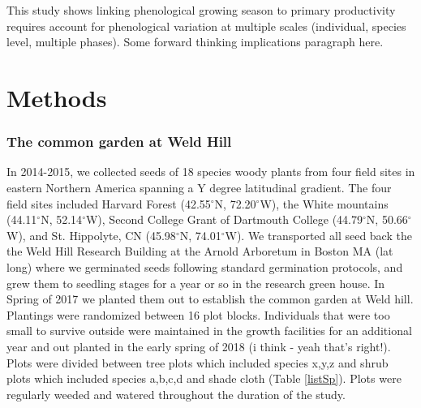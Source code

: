 \documentclass{article}[12pt]
\begin{document}
 This study shows linking phenological growing season to primary productivity requires account for phenological variation at multiple scales (individual, species level, multiple phases). Some forward thinking implications paragraph here.
 
 
\section{Methods} %
\subsubsection{The common garden at Weld Hill}
In 2014-2015, we collected seeds of 18 species woody plants from four field sites in eastern Northern America spanning a Y degree latitudinal gradient. The four field sites included Harvard Forest (42.55$^{\circ}$N, 72.20$^{\circ}$W), the White mountains (44.11$^{\circ}$N, 52.14$^{\circ}$W), Second College Grant of Dartmouth College (44.79$^{\circ}$N, 50.66$^{\circ}$W), and St. Hippolyte, CN (45.98$^{\circ}$N, 74.01$^{\circ}$W). We transported all seed back the the Weld Hill Research Building at the Arnold Arboretum in Boston MA (lat long) where we germinated seeds following standard germination protocols, and grew them to seedling stages for a year or so in the research green house. In Spring of 2017 we planted them out to establish the common garden at Weld hill. Plantings were randomized between 16 plot blocks. Individuals that were too small to survive outside were maintained in the growth facilities for an additional year and out planted in the early spring of 2018 (i think - yeah that's right!). Plots were divided between tree plots which included species x,y,z and shrub plots which included species a,b,c,d and shade cloth (Table \ref{listSp}). Plots were regularly weeded and watered throughout the duration of the study.
\end{document}
